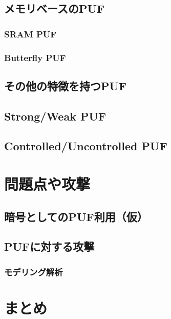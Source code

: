 \documentclass[technicalreport]{ieicej} %
\begin{document}
\subsection{メモリベースのPUF}
\subsubsection{SRAM PUF}
\subsubsection{Butterfly PUF}
\subsection{その他の特徴を持つPUF}
\subsection{Strong/Weak PUF}
\subsection{Controlled/Uncontrolled PUF}

\section{問題点や攻撃}
\subsection{暗号としてのPUF利用（仮）}

\subsection{PUFに対する攻撃}
\subsubsection{モデリング解析}
\section{まとめ}

\end{document}
